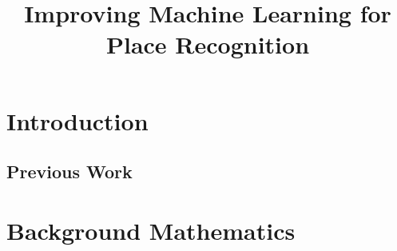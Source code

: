 \documentclass{bmvc}
\begin{document}

\title{Improving Machine Learning for\\Place Recognition}


\author{}

\maketitle


\begin{abstract}
  
\end{abstract}

\section{Introduction}
\label{introduction}


\subsection{Previous Work}
\label{prev-work}


\section{Background Mathematics}
\label{sec:bg}

\end{document}

